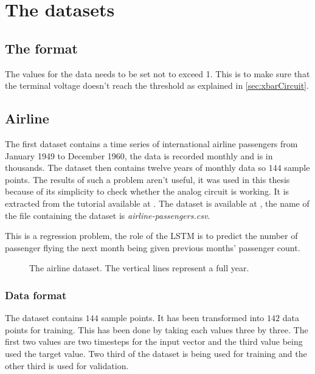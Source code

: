 \section{The datasets}\label{sec:dataset}

\subsection{The format}

The values for the data needs to be set not to exceed 1. This is to make sure that the terminal voltage doesn't reach the threshold as explained in \cref{sec:xbarCircuit}.

\subsection{Airline}

The first dataset contains a time series of international airline passengers from January 1949 to December 1960, the data is recorded monthly and is in thousands. The dataset then contains twelve years of monthly data so $144$ sample points. The results of such a problem aren't useful, it was used in this thesis because of its simplicity to check whether the analog circuit is working. It is extracted from the tutorial available at \cite{airline}. The dataset is available at \cite{datasets}, the name of the file containing the dataset is \textit{airline-passengers.csv}.

This is a regression problem, the role of the \ac{LSTM} is to predict the number of passenger flying the next month being given previous months' passenger count.

\begin{figure}[H]
  \centering
  
  \caption{The airline dataset. The vertical lines represent a full year.}
  \label{graph:airline}
\end{figure}

\subsubsection{Data format}

The dataset contains $144$ sample points. It has been transformed into $142$ data points for training. This has been done by taking each values three by three. The first two values are two timesteps for the input vector and the third value being used the target value. Two third of the dataset is being used for training and the other third is used for validation.

